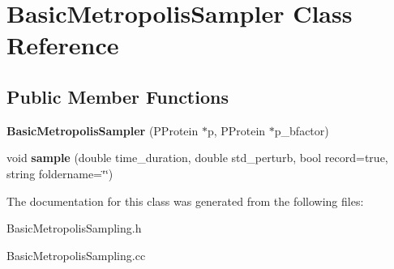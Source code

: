 \hypertarget{classBasicMetropolisSampler}{\section{Basic\-Metropolis\-Sampler Class Reference}
\label{classBasicMetropolisSampler}
}
\subsection*{Public Member Functions}
\begin{DoxyCompactItemize}
\item 
\hypertarget{classBasicMetropolisSampler_a66e3367b4b2d575a55a4bb1ad8774913}{{\bfseries Basic\-Metropolis\-Sampler} (P\-Protein $\ast$p, P\-Protein $\ast$p\-\_\-bfactor)}\label{classBasicMetropolisSampler_a66e3367b4b2d575a55a4bb1ad8774913}

\item 
\hypertarget{classBasicMetropolisSampler_a3104cd0a795c0f71dfeb624a89473dad}{void {\bfseries sample} (double time\-\_\-duration, double std\-\_\-perturb, bool record=true, string foldername=\char`\"{}\char`\"{})}\label{classBasicMetropolisSampler_a3104cd0a795c0f71dfeb624a89473dad}

\end{DoxyCompactItemize}


The documentation for this class was generated from the following files\-:\begin{DoxyCompactItemize}
\item 
Basic\-Metropolis\-Sampling.\-h\item 
Basic\-Metropolis\-Sampling.\-cc\end{DoxyCompactItemize}

